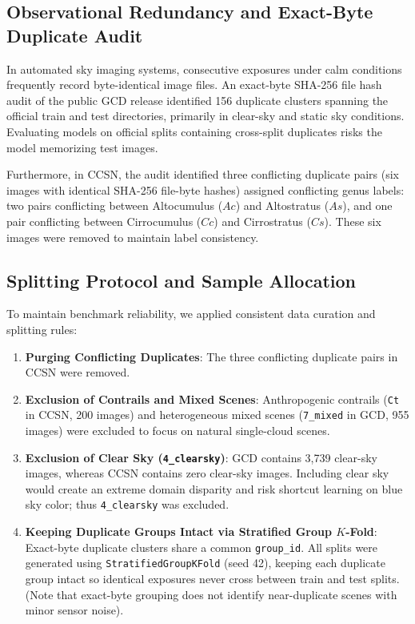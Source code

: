 \documentclass[11pt,a4paper]{article}
\begin{document}
\subsection{Observational Redundancy and Exact-Byte Duplicate Audit}

In automated sky imaging systems, consecutive exposures under calm conditions frequently record byte-identical image files. An exact-byte SHA-256 file hash audit of the public GCD release identified 156 duplicate clusters spanning the official train and test directories, primarily in clear-sky and static sky conditions. Evaluating models on official splits containing cross-split duplicates risks the model memorizing test images.

Furthermore, in CCSN, the audit identified three conflicting duplicate pairs (six images with identical SHA-256 file-byte hashes) assigned conflicting genus labels: two pairs conflicting between Altocumulus ($Ac$) and Altostratus ($As$), and one pair conflicting between Cirrocumulus ($Cc$) and Cirrostratus ($Cs$). These six images were removed to maintain label consistency.

\subsection{Splitting Protocol and Sample Allocation}

To maintain benchmark reliability, we applied consistent data curation and splitting rules:
\begin{enumerate}
    \item \textbf{Purging Conflicting Duplicates}: The three conflicting duplicate pairs in CCSN were removed.
    \item \textbf{Exclusion of Contrails and Mixed Scenes}: Anthropogenic contrails (\texttt{Ct} in CCSN, 200 images) and heterogeneous mixed scenes (\texttt{7\_mixed} in GCD, 955 images) were excluded to focus on natural single-cloud scenes.
    \item \textbf{Exclusion of Clear Sky (\texttt{4\_clearsky})}: GCD contains 3,739 clear-sky images, whereas CCSN contains zero clear-sky images. Including clear sky would create an extreme domain disparity and risk shortcut learning on blue sky color; thus \texttt{4\_clearsky} was excluded.
    \item \textbf{Keeping Duplicate Groups Intact via Stratified Group $K$-Fold}: Exact-byte duplicate clusters share a common \texttt{group\_id}. All splits were generated using \texttt{StratifiedGroupKFold} (seed 42), keeping each duplicate group intact so identical exposures never cross between train and test splits. (Note that exact-byte grouping does not identify near-duplicate scenes with minor sensor noise).
\end{enumerate}
\end{document}
